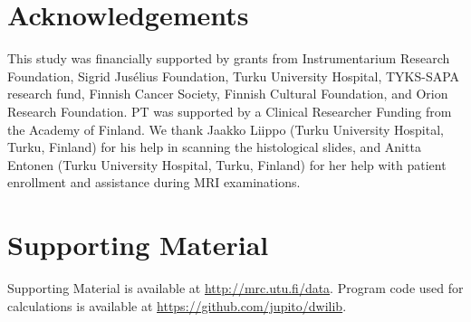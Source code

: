 \documentclass[10pt,letterpaper]{article}
\begin{document}
%
\newpage
\section{Acknowledgements}

This study was financially supported by grants from Instrumentarium Research
Foundation, Sigrid Jusélius Foundation, Turku University Hospital, TYKS-SAPA
research fund, Finnish Cancer Society, Finnish Cultural Foundation, and Orion
Research Foundation. PT was supported by a Clinical Researcher Funding from the
Academy of Finland. We thank Jaakko Liippo (Turku University Hospital, Turku,
Finland) for his help in scanning the histological slides, and Anitta Entonen
(Turku University Hospital, Turku, Finland) for her help with patient enrollment
and assistance during MRI examinations.

%
\newpage
\newcommand{\fig}[2]{\item Patient #1: #2 map, prostate mask, lesion masks.}
\newcommand{\figADCm}[1]{\fig{#1}{ADCₘ}}
\newcommand{\figTtw}[1]{\fig{#1}{T₂w}}
\newcommand{\figTt}[1]{\fig{#1}{T₂}}

\newcommand{\histology}[2]{\item Patient #1: #2.}
\newcommand{\pink}[1]{\histology{#1}{prostatectomy section}}


\section{Supporting Material}

Supporting Material is available at \url{http://mrc.utu.fi/data}. Program code
used for calculations is available at \url{https://github.com/jupito/dwilib}.
\end{document}
